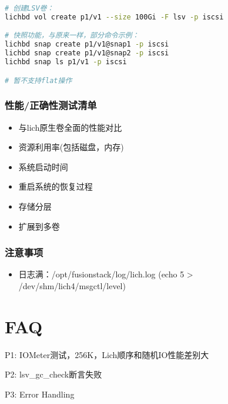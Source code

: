 \documentclass[UTF8]{ctexart}
\begin{document}
\begin{lstlisting}[language=bash,frame=single]
# 创建LSV卷：
lichbd vol create p1/v1 --size 100Gi -F lsv -p iscsi

# 快照功能，与原来一样，部分命令示例：
lichbd snap create p1/v1@snap1 -p iscsi
lichbd snap create p1/v1@snap2 -p iscsi
lichbd snap ls p1/v1 -p iscsi

# 暂不支持flat操作

\end{lstlisting}

\subsubsection{性能/正确性测试清单}

\begin{itemize}
    \item 与lich原生卷全面的性能对比
    \item 资源利用率(包括磁盘，内存)
    \item 系统启动时间
    \item 重启系统的恢复过程
    \item 存储分层
    \item 扩展到多卷
\end{itemize}

\subsubsection{注意事项}

\begin{itemize}
    \item 日志满：/opt/fusionstack/log/lich.log (echo 5 > /dev/shm/lich4/msgctl/level)
\end{itemize}

\section{FAQ}

P1: IOMeter测试，256K，Lich顺序和随机IO性能差别大

P2: lsv\_gc\_check断言失败

P3: Error Handling
\end{document}
